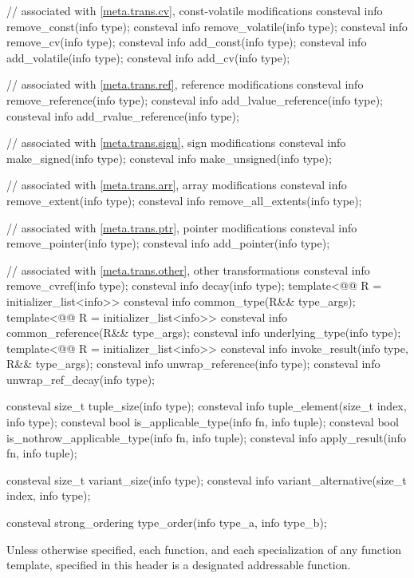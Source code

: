 \begin{codeblock}
{  // associated with \ref{meta.trans.cv}, const-volatile modifications
  consteval info remove_const(info type);
  consteval info remove_volatile(info type);
  consteval info remove_cv(info type);
  consteval info add_const(info type);
  consteval info add_volatile(info type);
  consteval info add_cv(info type);

  // associated with \ref{meta.trans.ref}, reference modifications
  consteval info remove_reference(info type);
  consteval info add_lvalue_reference(info type);
  consteval info add_rvalue_reference(info type);

  // associated with \ref{meta.trans.sign}, sign modifications
  consteval info make_signed(info type);
  consteval info make_unsigned(info type);

  // associated with \ref{meta.trans.arr}, array modifications
  consteval info remove_extent(info type);
  consteval info remove_all_extents(info type);

  // associated with \ref{meta.trans.ptr}, pointer modifications
  consteval info remove_pointer(info type);
  consteval info add_pointer(info type);

  // associated with \ref{meta.trans.other}, other transformations
  consteval info remove_cvref(info type);
  consteval info decay(info type);
  template<@@ R = initializer_list<info>>
    consteval info common_type(R&& type_args);
  template<@@ R = initializer_list<info>>
    consteval info common_reference(R&& type_args);
  consteval info underlying_type(info type);
  template<@@ R = initializer_list<info>>
    consteval info invoke_result(info type, R&& type_args);
  consteval info unwrap_reference(info type);
  consteval info unwrap_ref_decay(info type);

  consteval size_t tuple_size(info type);
  consteval info tuple_element(size_t index, info type);
  consteval bool is_applicable_type(info fn, info tuple);
  consteval bool is_nothrow_applicable_type(info fn, info tuple);
  consteval info apply_result(info fn, info tuple);

  consteval size_t variant_size(info type);
  consteval info variant_alternative(size_t index, info type);

  consteval strong_ordering type_order(info type_a, info type_b);
}
\end{codeblock}

\pnum
Unless otherwise specified,
each function, and each specialization of any function template,
specified in this header
is a designated addressable function.

